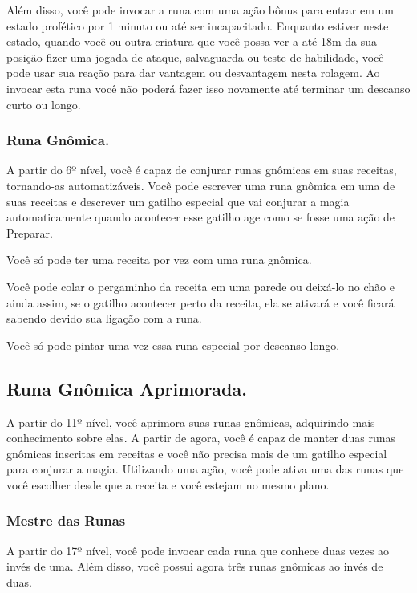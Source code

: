 \begin{multicols}{2}
Além disso, você pode invocar a runa com uma ação bônus para entrar em um estado
profético por 1 minuto ou até ser incapacitado. Enquanto estiver neste estado,
quando você ou outra criatura que você possa ver a até 18m da sua posição fizer
uma jogada de ataque, salvaguarda ou teste de habilidade, você pode usar sua
reação para dar vantagem ou desvantagem nesta rolagem. Ao invocar esta runa você
não poderá fazer isso novamente até terminar um descanso curto ou longo.

\subsubsection*{Runa Gnômica.}%

A partir do 6º nível, você é capaz de conjurar runas gnômicas em suas receitas,
tornando-as automatizáveis. Você pode escrever uma runa gnômica em uma de suas
receitas e descrever um gatilho especial que vai conjurar a magia
automaticamente quando acontecer esse gatilho age como se fosse uma ação de
Preparar.

Você só pode ter uma receita por vez com uma runa gnômica.

Você pode colar o pergaminho da receita em uma parede ou deixá-lo no chão e
ainda assim, se o gatilho acontecer perto da receita, ela se ativará e você
ficará sabendo devido sua ligação com a runa.

Você só pode pintar uma vez essa runa especial por descanso longo.

\subsection*{Runa Gnômica Aprimorada.}%

A partir do 11º nível, você aprimora suas runas gnômicas, adquirindo mais
conhecimento sobre elas. A partir de agora, você é capaz de manter duas runas
gnômicas inscritas em receitas e você não precisa mais de um gatilho especial
para conjurar a magia. Utilizando uma ação, você pode ativa uma das runas que
você escolher desde que a receita e você estejam no mesmo plano.

\subsubsection*{Mestre das Runas}%

A partir do 17º nível, você pode invocar cada runa que conhece duas vezes ao
invés de uma. Além disso, você possui agora três runas gnômicas ao invés de
duas.


\end{multicols}
